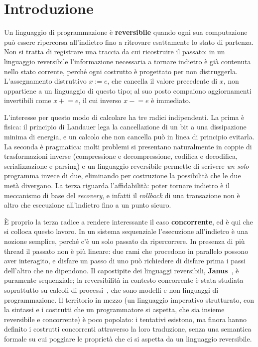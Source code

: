 
\chapter{Introduzione}
\label{sec:intro}

Un linguaggio di programmazione è \textbf{reversibile} quando ogni sua
computazione può essere ripercorsa all'indietro fino a ritrovare esattamente lo
stato di partenza. Non si tratta di registrare una traccia da cui ricostruire il
passato: in un linguaggio reversibile l'informazione necessaria a tornare
indietro è già contenuta nello stato corrente, perché ogni costrutto è
progettato per non distruggerla. L'assegnamento distruttivo $x := e$, che
cancella il valore precedente di $x$, non appartiene a un linguaggio di questo
tipo; al suo posto compaiono aggiornamenti invertibili come $x \mathrel{+}= e$,
il cui inverso $x \mathrel{-}= e$ è immediato.

L'interesse per questo modo di calcolare ha tre radici indipendenti. La prima è
fisica: il principio di Landauer lega la cancellazione di un bit a una
dissipazione minima di energia, e un calcolo che non cancella può in linea di
principio evitarla. La seconda è pragmatica: molti problemi si presentano
naturalmente in coppie di trasformazioni inverse (compressione e
decompressione, codifica e decodifica, serializzazione e parsing) e un
linguaggio reversibile permette di scrivere \emph{un solo} programma invece di
due, eliminando per costruzione la possibilità che le due metà divergano. La
terza riguarda l'affidabilità: poter tornare indietro è il meccanismo di base
del \emph{recovery}, e infatti il \emph{rollback} di una transazione non è altro
che esecuzione all'indietro fino a un punto sicuro.

\medskip
\noindent
È proprio la terza radice a rendere interessante il caso \textbf{concorrente},
ed è qui che si colloca questo lavoro. In un sistema sequenziale l'esecuzione
all'indietro è una nozione semplice, perché c'è un solo passato da ripercorrere.
In presenza di più thread il passato non è più lineare: due rami che procedono
in parallelo possono aver interagito, e disfare un passo di uno può richiedere
di disfare prima i passi dell'altro che ne dipendono. Il capostipite dei
linguaggi reversibili, \textbf{Janus}~\cite{YokoyamaGluck2007}, è puramente
sequenziale; la reversibilità in contesto concorrente è stata studiata
soprattutto su calcoli di processi~\cite{LaneseMezzinaSchmittStefani2011,%
LaneseLienhardtMezzinaSchmittStefani2013}, che sono modelli e non linguaggi di
programmazione. Il territorio in mezzo (un linguaggio imperativo strutturato,
con la sintassi e i costrutti che un programmatore si aspetta, che sia insieme
reversibile e concorrente) è poco popolato: i tentativi esistono, ma finora
hanno definito i costrutti concorrenti attraverso la loro traduzione, senza una
semantica formale su cui poggiare le proprietà che ci si aspetta da un
linguaggio reversibile.

